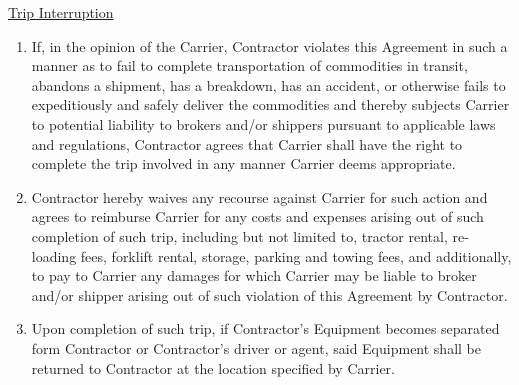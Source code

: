 \underline{Trip Interruption}
\begin{enumerate}
    \item If, in the opinion of the Carrier, Contractor violates this
    Agreement in such a manner as to fail to complete transportation of
    commodities in transit, abandons a shipment, has a breakdown, has an
    accident, or otherwise fails to expeditiously and safely deliver the
    commodities and thereby subjects Carrier to potential liability to
    brokers and/or shippers pursuant to applicable laws and regulations,
    Contractor agrees that Carrier shall have the right to complete the
    trip involved in any manner Carrier deems appropriate.

    \item Contractor hereby waives any recourse against Carrier for such
    action and agrees to reimburse Carrier for any costs and expenses
    arising out of such completion of such trip, including but not limited
    to, tractor rental, re-loading fees, forklift rental, storage, parking
    and towing fees, and additionally, to pay to Carrier any damages for
    which Carrier may be liable to broker and/or shipper arising out of
    such violation of this Agreement by Contractor.

    \item Upon completion of such trip, if Contractor's Equipment becomes
    separated form Contractor or Contractor's driver or agent, said
    Equipment shall be returned to Contractor at the location specified by
    Carrier.
\end{enumerate}